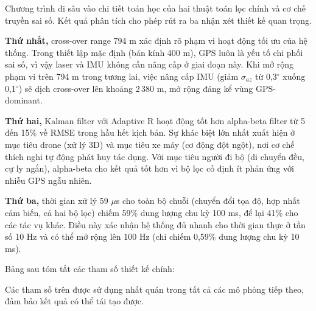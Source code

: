 \hspace{0.5cm} Chương trình đi sâu vào chi tiết toán học của hai thuật toán lọc chính và cơ chế truyền sai số. Kết quả phân tích cho phép rút ra ba nhận xét thiết kế quan trọng.

\textbf{Thứ nhất,} cross-over range 794 m xác định rõ phạm vi hoạt động tối ưu của hệ thống. Trong thiết lập mặc định (bán kính 400 m), GPS luôn là yếu tố chi phối sai số, vì vậy laser và IMU không cần nâng cấp ở giai đoạn này. Khi mở rộng phạm vi trên 794 m trong tương lai, việc nâng cấp IMU (giảm $\sigma_{az}$ từ 0,3$^\circ$ xuống 0,1$^\circ$) sẽ dịch cross-over lên khoảng 2\,380 m, mở rộng đáng kể vùng GPS-dominant.

\textbf{Thứ hai,} Kalman filter với Adaptive R hoạt động tốt hơn alpha-beta filter từ 5 đến 15\% về RMSE trong hầu hết kịch bản. Sự khác biệt lớn nhất xuất hiện ở mục tiêu drone (xử lý 3D) và mục tiêu xe máy (cơ động đột ngột), nơi cơ chế thích nghi tự động phát huy tác dụng. Với mục tiêu người đi bộ (di chuyển đều, cự ly ngắn), alpha-beta cho kết quả tốt hơn vì bộ lọc cố định ít phản ứng với nhiễu GPS ngẫu nhiên.

\textbf{Thứ ba,} thời gian xử lý 59 $\mu$s cho toàn bộ chuỗi (chuyển đổi tọa độ, hợp nhất cảm biến, cả hai bộ lọc) chiếm 59\% dung lượng chu kỳ 100 ms, để lại 41\% cho các tác vụ khác. Điều này xác nhận hệ thống đủ nhanh cho thời gian thực ở tần số 10 Hz và có thể mở rộng lên 100 Hz (chỉ chiếm 0,59\% dung lượng chu kỳ 10 ms).

Bảng sau tóm tắt các tham số thiết kế chính:

\begin{table}[H]
\centering
\caption{Tóm tắt tham số thiết kế thuật toán lọc}
\label{tab:design-params-summary}
\end{table}

Các tham số trên được sử dụng nhất quán trong tất cả các mô phỏng tiếp theo, đảm bảo kết quả có thể tái tạo được.
